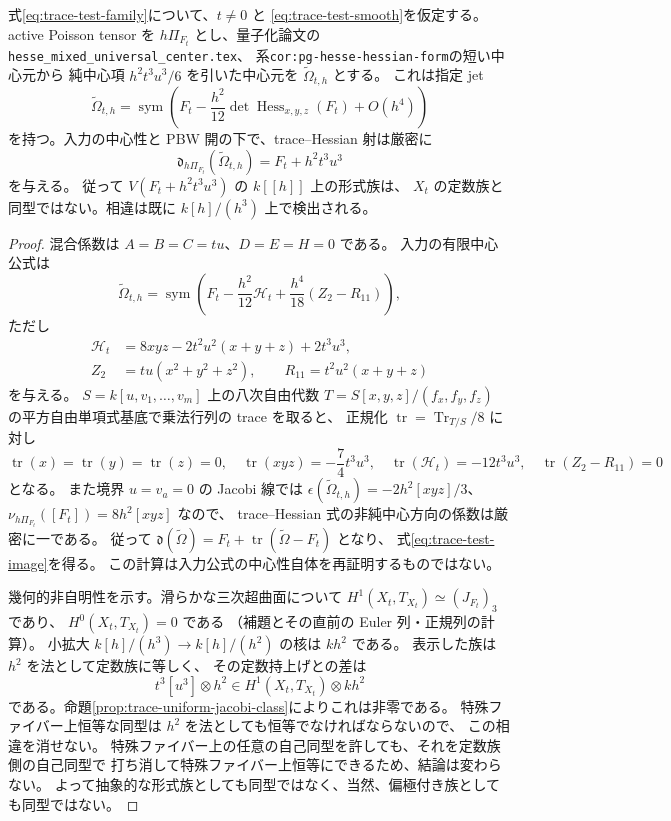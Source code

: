\begin{proposition}
\label{prop:trace-nonconstant-classical-family}
式\eqref{eq:trace-test-family}について、$t\ne0$ と
\eqref{eq:trace-test-smooth}を仮定する。
active Poisson tensor を $h\Pi_{F_t}$ とし、量子化論文の
\texttt{hesse\_mixed\_universal\_center.tex}、
系\texttt{cor:pg-hesse-hessian-form}\cite{CubicQuantization}の短い中心元から
純中心項 $h^2t^3u^3/6$ を引いた中心元を $\widetilde\Omega_{t,h}$ とする。
これは指定 jet
\[
 \widetilde\Omega_{t,h}
 =\operatorname{sym}\left(F_t-\frac{h^2}{12}
     \det\operatorname{Hess}_{x,y,z}(F_t)+O(h^4)\right)
\]
を持つ。入力の中心性と PBW 開の下で、trace--Hessian 射は厳密に
\begin{equation}\label{eq:trace-test-image}
 \mathfrak d_{h\Pi_{F_t}}(\widetilde\Omega_{t,h})
       =F_t+h^2t^3u^3
\end{equation}
を与える。
従って $V(F_t+h^2t^3u^3)$ の $k[[h]]$ 上の形式族は、
$X_t$ の定数族と同型ではない。相違は既に $k[h]/(h^3)$ 上で検出される。
\end{proposition}

\begin{proof}
混合係数は $A=B=C=tu$、$D=E=H=0$ である。
入力の有限中心公式は
\[
 \widetilde\Omega_{t,h}
 =\operatorname{sym}\left(F_t-\frac{h^2}{12}\mathscr H_t
       +\frac{h^4}{18}(Z_2-R_{11})\right),
\]
ただし
\[
 \begin{aligned}
 \mathscr H_t&=8xyz-2t^2u^2(x+y+z)+2t^3u^3,\\
 Z_2&=tu(x^2+y^2+z^2),\qquad
 R_{11}=t^2u^2(x+y+z)
 \end{aligned}
\]
を与える。
$S=k[u,v_1,\ldots,v_m]$ 上の八次自由代数
$T=S[x,y,z]/(f_x,f_y,f_z)$ の平方自由単項式基底で乗法行列の trace を取ると、
正規化 $\operatorname{tr}=\operatorname{Tr}_{T/S}/8$ に対し
\[
 \operatorname{tr}(x)=\operatorname{tr}(y)=\operatorname{tr}(z)=0,
 \quad \operatorname{tr}(xyz)=-\frac74t^3u^3,
 \quad \operatorname{tr}(\mathscr H_t)=-12t^3u^3,
 \quad \operatorname{tr}(Z_2-R_{11})=0
\]
となる。
また境界 $u=v_a=0$ の Jacobi 線では
$\epsilon(\widetilde\Omega_{t,h})=-2h^2[xyz]/3$、
$\nu_{h\Pi_{F_t}}([F_t])=8h^2[xyz]$ なので、
trace--Hessian 式の非純中心方向の係数は厳密に一である。
従って $\mathfrak d(\widetilde\Omega)=F_t+
\operatorname{tr}(\widetilde\Omega-F_t)$ となり、
式\eqref{eq:trace-test-image}を得る。
この計算は入力公式の中心性自体を再証明するものではない。

幾何的非自明性を示す。滑らかな三次超曲面について
$H^1(X_t,T_{X_t})\simeq(J_{F_t})_3$ であり、
$H^0(X_t,T_{X_t})=0$ である
（補題とその直前の Euler 列・正規列の計算）。
小拡大 $k[h]/(h^3)\to k[h]/(h^2)$ の核は $kh^2$ である。
表示した族は $h^2$ を法として定数族に等しく、
その定数持上げとの差は
\[
 t^3[u^3]\otimes h^2\in H^1(X_t,T_{X_t})\otimes kh^2
\]
である。命題\ref{prop:trace-uniform-jacobi-class}によりこれは非零である。
特殊ファイバー上恒等な同型は $h^2$ を法としても恒等でなければならないので、
この相違を消せない。
特殊ファイバー上の任意の自己同型を許しても、それを定数族側の自己同型で
打ち消して特殊ファイバー上恒等にできるため、結論は変わらない。
よって抽象的な形式族としても同型ではなく、当然、偏極付き族としても同型ではない。
\end{proof}

